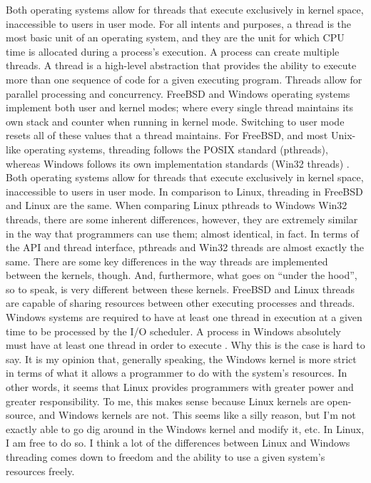 \documentclass[letterpaper,10pt,draftclsnofoot,onecolumn]{IEEEtran}
\begin{document}
Both operating systems allow for threads that execute exclusively in kernel space, inaccessible to users in user mode.
For all intents and purposes, a thread is the most basic unit of an operating system, and they are the unit for which CPU time is allocated during a process’s execution. A process can create multiple threads. A thread is a high-level abstraction that provides the ability to execute more than one sequence of code for a given executing program. Threads allow for parallel processing and concurrency. FreeBSD and Windows operating systems implement both user and kernel modes; where every single thread maintains its own stack and counter when running in kernel mode. Switching to user mode resets all of these values that a thread maintains. For FreeBSD, and most Unix-like operating systems, threading follows the POSIX standard (pthreads), whereas Windows follows its own implementation standards (Win32 threads) \cite{MSWindows1} \cite{FreeBSD2}. Both operating systems allow for threads that execute exclusively in kernel space, inaccessible to users in user mode.
In comparison to Linux, threading in FreeBSD and Linux are the same. When comparing Linux pthreads to Windows Win32 threads, there are some inherent differences, however, they are extremely similar in the way that programmers can use them; almost identical, in fact. In terms of the API and thread interface, pthreads and Win32 threads are almost exactly the same. There are some key differences in the way threads are implemented between the kernels, though. And, furthermore, what goes on “under the hood”, so to speak, is very different between these kernels. FreeBSD and Linux threads are capable of sharing resources between other executing processes and threads. Windows systems are required to have at least one thread in execution at a given time to be processed by the I/O scheduler. A process in Windows absolutely must have at least one thread in order to execute \cite{MSWindows1}. Why this is the case is hard to say. It is my opinion that, generally speaking, the Windows kernel is more strict in terms of what it allows a programmer to do with the system’s resources. In other words, it seems that Linux provides programmers with greater power and greater responsibility. To me, this makes sense because Linux kernels are open-source, and Windows kernels are not. This seems like a silly reason, but I’m not exactly able to go dig around in the Windows kernel and modify it, etc. In Linux, I am free to do so. I think a lot of the differences between Linux and Windows threading comes down to freedom and the ability to use a given system’s resources freely.\\
\end{document}

